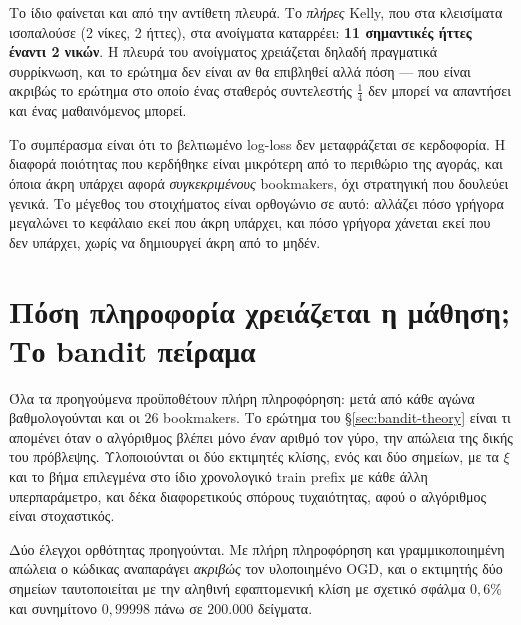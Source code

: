 \documentclass[12pt,a4paper,oneside]{report}
\renewcommand{\_}{\oldunderscore\allowbreak}
\theoremstyle{definition}
\theoremstyle{plain}
\theoremstyle{remark}
\begin{document}
Το ίδιο φαίνεται και από την αντίθετη πλευρά. Το \emph{πλήρες} Kelly, που στα κλεισίματα
ισοπαλούσε (2 νίκες, 2 ήττες), στα ανοίγματα καταρρέει: \textbf{11 σημαντικές ήττες έναντι 2
νικών}. Η πλευρά του ανοίγματος χρειάζεται δηλαδή πραγματικά συρρίκνωση, και το ερώτημα δεν
είναι αν θα επιβληθεί αλλά πόση --- που είναι ακριβώς το ερώτημα στο οποίο ένας σταθερός
συντελεστής $\tfrac14$ δεν μπορεί να απαντήσει και ένας μαθαινόμενος μπορεί.

Το συμπέρασμα είναι ότι το βελτιωμένο log-loss δεν μεταφράζεται σε κερδοφορία. Η διαφορά
ποιότητας που κερδήθηκε είναι μικρότερη από το περιθώριο της αγοράς, και όποια άκρη υπάρχει
αφορά \emph{συγκεκριμένους} bookmakers, όχι στρατηγική που δουλεύει γενικά. Το μέγεθος του
στοιχήματος είναι ορθογώνιο σε αυτό: αλλάζει πόσο γρήγορα μεγαλώνει το κεφάλαιο εκεί που
άκρη υπάρχει, και πόσο γρήγορα χάνεται εκεί που δεν υπάρχει, χωρίς να δημιουργεί άκρη από το
μηδέν.

\section{Πόση πληροφορία χρειάζεται η μάθηση; Το bandit πείραμα}
\label{sec:res-bandit}

Όλα τα προηγούμενα προϋποθέτουν πλήρη πληροφόρηση: μετά από κάθε αγώνα βαθμολογούνται και οι
$26$ bookmakers. Το ερώτημα του \S\ref{sec:bandit-theory} είναι τι απομένει όταν ο
αλγόριθμος βλέπει μόνο \emph{έναν} αριθμό τον γύρο, την απώλεια της δικής του πρόβλεψης.
Υλοποιούνται οι δύο εκτιμητές κλίσης, ενός και δύο σημείων, με τα $\xi$ και το βήμα
επιλεγμένα στο ίδιο χρονολογικό train prefix με κάθε άλλη υπερπαράμετρο, και δέκα
διαφορετικούς σπόρους τυχαιότητας, αφού ο αλγόριθμος είναι στοχαστικός.

Δύο έλεγχοι ορθότητας προηγούνται. Με πλήρη πληροφόρηση και γραμμικοποιημένη απώλεια ο
κώδικας αναπαράγει \emph{ακριβώς} τον υλοποιημένο OGD, και ο εκτιμητής δύο σημείων
ταυτοποιείται με την αληθινή εφαπτομενική κλίση με σχετικό σφάλμα $0{,}6\%$ και συνημίτονο
$0{,}99998$ πάνω σε $200.000$ δείγματα.
\end{document}
